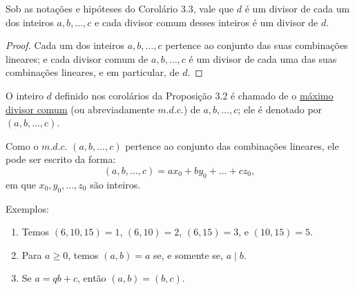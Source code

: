 \begin{corolario}
Sob as notações e hipóteses do Corolário 3.3, vale que $d$ é um 
divisor de cada um dos inteiros $a, b, \ldots, c$ e cada divisor comum desses inteiros é um divisor de $d$.
\end{corolario}

\begin{proof}
Cada um dos inteiros $a, b, \ldots, c$ pertence ao conjunto das suas combinações lineares; e cada divisor comum de 
$a, b, \ldots, c$ é um divisor de cada uma das suas combinações lineares, e em particular, de $d$.
\end{proof}

\begin{definicao}
O inteiro $d$ definido nos corolários da Proposição 3.2 é chamado 
de o \underline{máximo divisor comum} (ou abreviadamente $m.d.c.$) de $a, b, \ldots, c$; ele é denotado por $(a, b, \ldots, c)$. 

Como o $m.d.c.$ $(a, b, \ldots, c)$ pertence ao conjunto das combinações lineares, ele pode ser escrito da forma: 
\[
(a, b, \ldots, c) = ax_0 + by_0 + \ldots + cz_0,
\]
em que $x_0, y_0, \ldots, z_0$ são inteiros.
\end{definicao}

Exemplos:
\begin{enumerate}[left=0.5cm, align=left, nosep]
    \item Temos $(6, 10, 15) = 1$, $(6, 10) = 2$, $(6, 15) = 3$, e $(10, 15) = 5$.
    \item Para $a \ge 0$, temos $(a, b) = a$ se, e somente se, $a \mid b$.
    \item Se $a = qb + c$, então $(a, b) = (b, c)$.
\end{enumerate}

